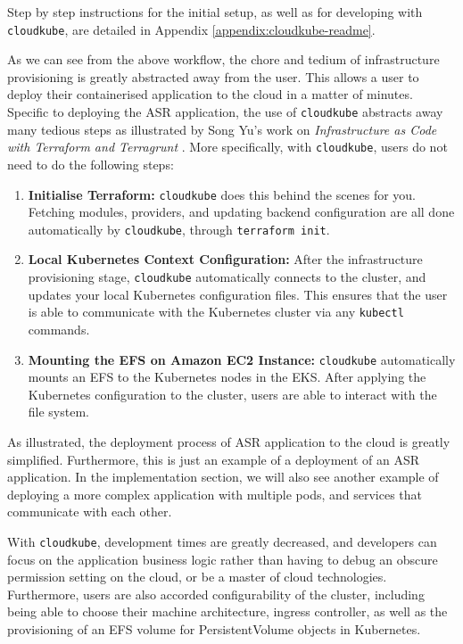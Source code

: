 Step by step instructions for the initial setup, as well as for developing with \texttt{cloudkube}, are detailed in Appendix \ref{appendix:cloudkube-readme}.

As we can see from the above workflow, the chore and tedium of infrastructure provisioning is greatly abstracted away from the user. This allows a user to deploy their containerised application to the cloud in a matter of minutes.  Specific to deploying the ASR application, the use of \texttt{cloudkube} abstracts away many tedious steps as illustrated by Song Yu’s work on \textit{Infrastructure as Code with Terraform and Terragrunt} \cite{song-yu-2023}. More specifically, with \texttt{cloudkube}, users do not need to do the following steps:
\vspace{-1em}
\begin{enumerate}
    \item \textbf{Initialise Terraform:} \texttt{cloudkube} does this behind the scenes for you. Fetching modules, providers, and updating backend configuration are all done automatically by \texttt{cloudkube}, through \texttt{terraform init}.
    \item \textbf{Local Kubernetes Context Configuration:} After the infrastructure provisioning stage, \texttt{cloudkube} automatically connects to the cluster, and updates your local Kubernetes configuration files. This ensures that the user is able to communicate with the Kubernetes cluster via any \texttt{kubectl} commands. 
    \item \textbf{Mounting the EFS on Amazon EC2 Instance:} \texttt{cloudkube} automatically mounts an EFS to the Kubernetes nodes in the EKS. After applying the Kubernetes configuration to the cluster, users are able to interact with the file system.
    
\end{enumerate}

As illustrated, the deployment process of ASR application to the cloud is greatly simplified. Furthermore, this is just an example of a deployment of an ASR application. In the implementation section, we will also see another example of deploying a more complex application with multiple pods, and services that communicate with each other.

With \texttt{cloudkube}, development times are greatly decreased, and developers can focus on the application business logic rather than having to debug an obscure permission setting on the cloud, or be a master of cloud technologies. Furthermore, users are also accorded configurability of the cluster, including being able to choose their machine architecture, ingress controller, as well as the provisioning of an EFS volume for PersistentVolume objects in Kubernetes. 

